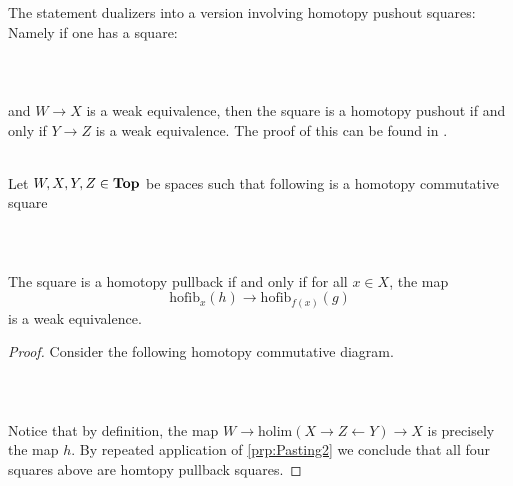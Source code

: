 \documentclass[a4paper]{article}
\begin{document}
The statement dualizers into a version involving homotopy pushout squares: Namely if one has a square: 
 \\~\\  \\~\\
and $W\to X$ is a weak equivalence, then the square is a homotopy pushout if and only if $Y\to Z$ is a weak equivalence. The proof of this can be found in \cite{CHT}. 

\begin{prp}{}{}\\
Let $W,X,Y,Z\in\bold{Top}$ be spaces such that following is a homotopy commutative square  
 \\~\\  \\~\\
The square is a homotopy pullback if and only if for all $x\in X$, the map $$\text{hofib}_x(h)\to\text{hofib}_{f(x)}(g)$$ is a weak equivalence. 
\begin{proof}
Consider the following homotopy commutative diagram. 
 \\~\\  \\~\\
Notice that by definition, the map $W\to\text{holim}(X\rightarrow Z\leftarrow Y)\to X$ is precisely the map $h$. By repeated application of \ref{prp:Pasting2} we conclude that all four squares above are homtopy pullback squares. 


\end{proof}
\end{prp}
\end{document}

